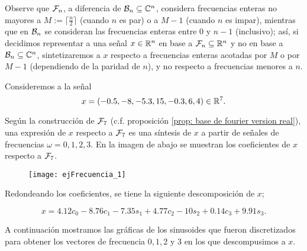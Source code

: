 \begin{nota}
\label{nota: frecuencias en las bases de fourier}
Observe que $\mathcal{F}_{n}$, a diferencia de $\mathcal{B}_{n} \subseteq \mathbb{C}^{n}$, 
considera frecuencias enteras no mayores a $M := \lceil \frac{n}{2} \rceil$
(cuando $n$ es par) o a $M-1$ (cuando $n$ es impar), mientras que
en $\mathcal{B}_{n}$ se consideran las frecuencias enteras entre $0$
y $n-1$ (inclusivo); así, si decidimos representar
a una señal $x \in \mathbb{R}^{n}$ en base a $\mathcal{F}_{n} \subseteq \mathbb{R}^{n}$
y no en base a $\mathcal{B}_{n} \subseteq \mathbb{C}^{n}$, sintetizaremos a $x$
respecto a frecuencias enteras acotadas por $M$ o por $M-1$ 
(dependiendo de la paridad de $n$), y no respecto a frecuencias
menores a $n$.
\end{nota}

\begin{ejemplo}
\label{ej: DFT1}
Consideremos a la señal 
\begin{equation}
\label{eq2: 10ab}
x=(-0.5,-8,-5.3,15,-0.3,6,4) \in \mathbb{R}^{7}.
\end{equation}

Según la construcción de $\mathcal{F}_{7}$ (c.f. 
proposición \ref{prop: base de fourier version real}),
una expresión de $x$ respecto a $\mathcal{F}_{7}$ 
es una síntesis de $x$ a partir de señales 
de frecuencias $\omega = 0,1,2,3$. En la imagen de abajo
se muestran los coeficientes de $x$ respecto a $\mathcal{F}_{7}$.

\begin{figure}[H]
	\centering
	\texttt{[image: ejFrecuencia\_1]} 
\end{figure}	

Redondeando los coeficientes, 
se tiene la siguiente descomposición de $x$;

\begin{equation}
\label{eq: analisis x TDF}
x = 4.12 c_{0} - 8.76c_{1} -7.35s_{1}+
4.77c_{2}-10s_{2}+0.14c_{3}+9.91s_{3}.
\end{equation}

\noindent
A continuación mostramos las gráficas
de los sinusoides que fueron discretizados
para obtener los vectores de frecuencia
$0,1,2$ y $3$ en los que descompusimos a $x$.


\end{ejemplo}
